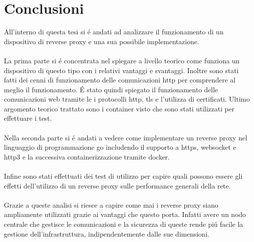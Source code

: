 \chapter{Conclusioni}
\label{cha:conclusions}

All'interno di questa tesi si é andati ad analizzare il funzionamento di un dispositivo di reverse proxy e una sua possibile implementazione.\\\\
La prima parte si é concentrata nel spiegare a livello teorico come funziona un dispositivo di questo tipo con i relativi vantaggi e svantaggi. Inoltre sono stati fatti dei cenni di funzionamento delle comunicazioni http per comprendere al meglio il funzionamento. É stato quindi spiegato il funzionamento delle comunicazioni web tramite le i protocolli http, tls e l'utilizza di certificati. Ultimo argomento teorico trattato sono i container visto che sono stati utilizzati per effettuare i test.\\\\
Nella seconda parte si é andati a vedere come implementare un reverse proxy nel linguaggio di programmazione go includendo il supporto a https, websocket e http3 e la successiva containerizzazione tramite docker.\\\\
Infine sono stati effettuati dei test di utilizzo per capire quali possono essere gli effetti dell'utilizzo di un reverse proxy sulle performance generali della rete.\\\\
Grazie a queste analisi si riesce a capire come mai i reverse proxy siano ampliamente utilizzati grazie ai vantaggi che questo porta. Infatti avere un nodo centrale che gestisce le comunicazioni e la sicurezza di queste rende piú facile la gestione dell'infrastruttura, indipendentemente dalle sue dimensioni.
